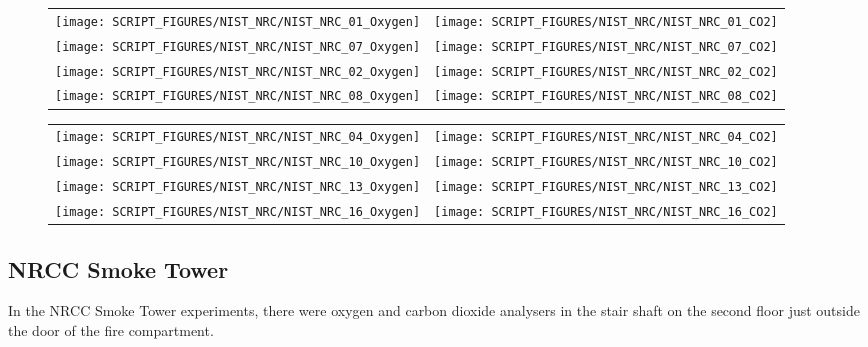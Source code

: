 \begin{figure}[p]
\begin{tabular*}{\textwidth}{l@{\extracolsep{\fill}}r}
\texttt{[image: SCRIPT\_FIGURES/NIST\_NRC/NIST\_NRC\_01\_Oxygen]} &
\texttt{[image: SCRIPT\_FIGURES/NIST\_NRC/NIST\_NRC\_01\_CO2]} \\
\texttt{[image: SCRIPT\_FIGURES/NIST\_NRC/NIST\_NRC\_07\_Oxygen]} &
\texttt{[image: SCRIPT\_FIGURES/NIST\_NRC/NIST\_NRC\_07\_CO2]} \\
\texttt{[image: SCRIPT\_FIGURES/NIST\_NRC/NIST\_NRC\_02\_Oxygen]} &
\texttt{[image: SCRIPT\_FIGURES/NIST\_NRC/NIST\_NRC\_02\_CO2]} \\
\texttt{[image: SCRIPT\_FIGURES/NIST\_NRC/NIST\_NRC\_08\_Oxygen]} &
\texttt{[image: SCRIPT\_FIGURES/NIST\_NRC/NIST\_NRC\_08\_CO2]}
\end{tabular*}
\label{NIST_NRC_Gas_Closed_1}
\end{figure}

\begin{figure}[p]
\begin{tabular*}{\textwidth}{l@{\extracolsep{\fill}}r}
\texttt{[image: SCRIPT\_FIGURES/NIST\_NRC/NIST\_NRC\_04\_Oxygen]} &
\texttt{[image: SCRIPT\_FIGURES/NIST\_NRC/NIST\_NRC\_04\_CO2]} \\
\texttt{[image: SCRIPT\_FIGURES/NIST\_NRC/NIST\_NRC\_10\_Oxygen]} &
\texttt{[image: SCRIPT\_FIGURES/NIST\_NRC/NIST\_NRC\_10\_CO2]} \\
\texttt{[image: SCRIPT\_FIGURES/NIST\_NRC/NIST\_NRC\_13\_Oxygen]} &
\texttt{[image: SCRIPT\_FIGURES/NIST\_NRC/NIST\_NRC\_13\_CO2]} \\
\texttt{[image: SCRIPT\_FIGURES/NIST\_NRC/NIST\_NRC\_16\_Oxygen]} &
\texttt{[image: SCRIPT\_FIGURES/NIST\_NRC/NIST\_NRC\_16\_CO2]}
\end{tabular*}
\label{NIST_NRC_Gas_Closed_2}
\end{figure}


\clearpage

\subsection{NRCC Smoke Tower}

In the NRCC Smoke Tower experiments, there were oxygen and carbon dioxide analysers in the stair shaft on the second floor just outside the door of the fire compartment.

